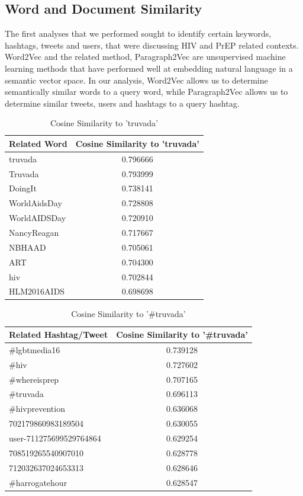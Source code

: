 \documentclass{sig-alternate-05-2015}
\begin{document}
\subsection{Word and Document Similarity}

The first analyses that we performed sought to identify certain keywords, hashtags, tweets and users, that were discussing HIV and PrEP related contexts. Word2Vec and the related method, Paragraph2Vec are unsupervised machine learning methods that have performed well at embedding natural language in a semantic vector space. In our analysis, Word2Vec allows us to determine semantically similar words to a query word, while Paragraph2Vec allows us to determine similar tweets, users and hashtags to a query hashtag.


\begin{table}
\centering
\caption{Cosine Similarity to 'truvada'}
\begin{tabular}{|l|c|} \hline
Related Word & Cosine Similarity to 'truvada'\\ \hline
truvada & 0.796666\\ \hline
Truvada & 0.793999\\ \hline
DoingIt & 0.738141\\ \hline
WorldAidsDay & 0.728808\\ \hline
WorldAIDSDay & 0.720910\\ \hline
NancyReagan & 0.717667\\ \hline
NBHAAD & 0.705061\\ \hline
ART & 0.704300\\ \hline
hiv & 0.702844\\ \hline
HLM2016AIDS & 0.698698\\ \hline
\hline\end{tabular}
\end{table}

\begin{table}
\centering
\caption{Cosine Similarity to '\#truvada'}
\begin{tabular}{|l|c|} \hline
Related Hashtag/Tweet & Cosine Similarity to '\#truvada'\\ \hline
\#lgbtmedia16 & 0.739128\\ \hline
\#hiv & 0.727602\\ \hline
\#whereisprep & 0.707165\\ \hline
\#truvada & 0.696113\\ \hline
\#hivprevention & 0.636068\\ \hline
702179860983189504 & 0.630055\\ \hline
user-711275699529764864 & 0.629254\\ \hline
708519265540907010 & 0.628778\\ \hline
712032637024653313 & 0.628646\\ \hline
\#harrogatehour & 	0.628547\\ \hline
\hline\end{tabular}
\end{table}
\end{document}

